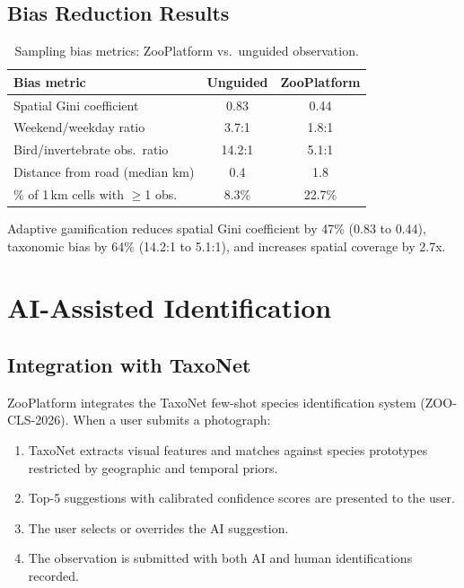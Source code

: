 \documentclass[11pt,a4paper]{article}
\begin{document}
\subsection{Bias Reduction Results}

\begin{table}[H]
\centering
\caption{Sampling bias metrics: ZooPlatform vs.\ unguided observation.}
\label{tab:bias}
\begin{tabular}{lcc}
\toprule
\textbf{Bias metric} & \textbf{Unguided} & \textbf{ZooPlatform} \\
\midrule
Spatial Gini coefficient & 0.83 & 0.44 \\
Weekend/weekday ratio & 3.7:1 & 1.8:1 \\
Bird/invertebrate obs.\ ratio & 14.2:1 & 5.1:1 \\
Distance from road (median km) & 0.4 & 1.8 \\
\% of 1\,km cells with $\geq$1 obs. & 8.3\% & 22.7\% \\
\bottomrule
\end{tabular}
\end{table}

Adaptive gamification reduces spatial Gini coefficient by 47\% (0.83 to
0.44), taxonomic bias by 64\% (14.2:1 to 5.1:1), and increases spatial
coverage by 2.7x.


\section{AI-Assisted Identification}
\label{sec:ai}

\subsection{Integration with TaxoNet}

ZooPlatform integrates the TaxoNet few-shot species identification
system (ZOO-CLS-2026). When a user submits a photograph:

\begin{enumerate}
  \item TaxoNet extracts visual features and matches against species
    prototypes restricted by geographic and temporal priors.
  \item Top-5 suggestions with calibrated confidence scores are
    presented to the user.
  \item The user selects or overrides the AI suggestion.
  \item The observation is submitted with both AI and human
    identifications recorded.
\end{enumerate}
\end{document}
